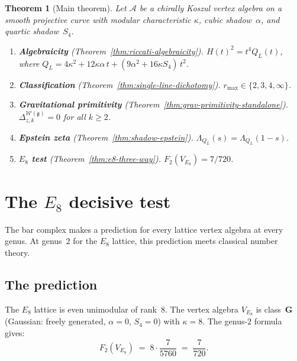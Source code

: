 \documentclass[11pt,reqno]{amsart}
\newtheorem{theorem}{Theorem}[section]
\theoremstyle{definition}
\theoremstyle{remark}
\newcommand{\cA}{\mathcal{A}}
\newcommand{\fg}{\mathfrak{g}}
\newcommand{\cW}{\mathcal{W}}
\numberwithin{equation}{section}
\begin{document}
\begin{theorem}[Main theorem]\label{thm:main}
Let\/ $\cA$ be a chirally Koszul vertex algebra on a smooth
projective curve with modular characteristic $\kappa$,
cubic shadow~$\alpha$, and quartic shadow~$S_4$.
\begin{enumerate}[label=\textup{(\roman*)}]
\item \textbf{Algebraicity}
 \textup{(}Theorem~\textup{\ref{thm:riccati-algebraicity}}\textup{)}.
 $H(t)^2 = t^4 Q_L(t)$, where
 $Q_L = 4\kappa^2 + 12\kappa\alpha\,t
 + (9\alpha^2 + 16\kappa S_4)\,t^2$.
\item \textbf{Classification}
 \textup{(}Theorem~\textup{\ref{thm:single-line-dichotomy}}\textup{)}.
 $r_{\max} \in \{2, 3, 4, \infty\}$.
\item \textbf{Gravitational primitivity}
 \textup{(}Theorem~\textup{\ref{thm:grav-primitivity-standalone}}\textup{)}.
 $\Delta_{z,k}^{\cW(\fg)} = 0$ for all $k \ge 2$.
\item \textbf{Epstein zeta}
 \textup{(}Theorem~\textup{\ref{thm:shadow-epstein}}\textup{)}.
 $\Lambda_{Q_L}(s) = \Lambda_{Q_L}(1-s)$.
\item \textbf{$E_8$ test}
 \textup{(}Theorem~\textup{\ref{thm:e8-three-way}}\textup{)}.
 $F_2(V_{E_8}) = 7/720$.
\end{enumerate}
\end{theorem}









\section{The $E_8$ decisive test}
\label{sec:e8-test}

The bar complex makes a prediction for every lattice vertex
algebra at every genus. At genus~$2$ for the $E_8$ lattice,
this prediction meets classical number theory.

\subsection{The prediction}

The $E_8$ lattice is even unimodular of rank~$8$. The vertex
algebra $V_{E_8}$ is class~$\mathbf{G}$ (Gaussian: freely
generated, $\alpha = 0$, $S_4 = 0$) with $\kappa = 8$.
The genus-$2$ formula gives:
\begin{equation}\label{eq:e8-f2}
 F_2(V_{E_8})
 \;=\;
 8 \cdot \frac{7}{5760}
 \;=\;
 \frac{7}{720}.
\end{equation}
\end{document}
